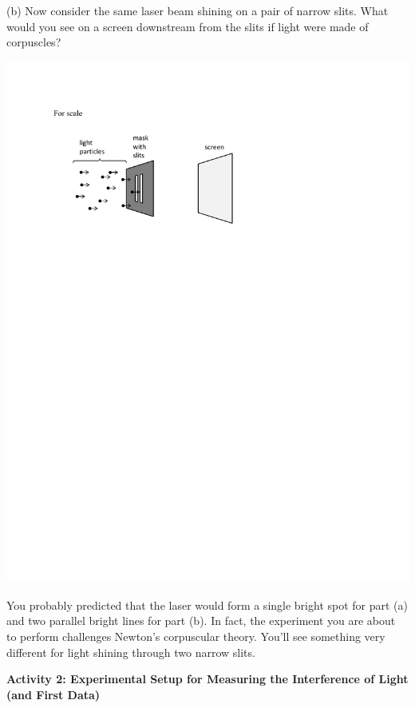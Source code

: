 
(b) Now consider the same laser beam shining on a pair of narrow slits.
What would you see on a screen downstream from the slits if light
were made of corpuscles?

{\centering \includegraphics[scale=0.85]{interference_of_light/particles_two_slits.pdf} \par}

You probably predicted that the laser would
form a single bright spot for part (a) and two parallel bright lines for part
(b).  In fact, the experiment you are about to perform challenges Newton's corpuscular theory. 
You'll see something very different for light shining through two narrow slits.


\textbf{Activity 2: Experimental Setup for Measuring the Interference of Light (and First Data)}

